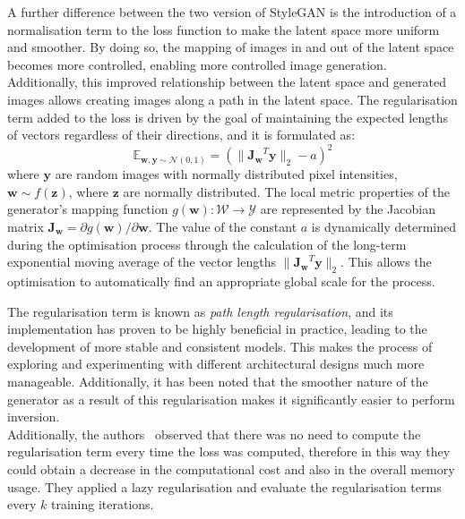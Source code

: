 \noindent A further difference between the two version of StyleGAN is the introduction of a normalisation term to the loss function to make the latent space more uniform and smoother. By doing so, the mapping of images in and out of the latent space becomes more controlled, enabling more controlled image generation. Additionally, this improved relationship between the latent space and generated images allows creating images along a path in the latent space. The regularisation term added to the loss is driven by the goal of maintaining the expected lengths of vectors regardless of their directions, and it is formulated as:
\begin{equation}
    \mathbb{E}_{\mathbf{w,y}\sim \mathcal{N}(0,1)}=(\| \mathbf{J_w}^T\mathbf{y}\|_2 - a)^2
\end{equation}
where $\mathbf{y}$ are random images with normally distributed pixel intensities, $\mathbf{w} \sim f(\mathbf{z})$, where $\mathbf{z}$ are normally distributed. The local metric properties of the generator's mapping function $g(\mathbf{w}): \mathcal{W}\rightarrow \mathcal{Y}$ are represented by the Jacobian matrix $\mathbf{J_w}=\partial g(\mathbf{w})/\partial \mathbf{w}$.
The value of the constant $a$ is dynamically determined during the optimisation process through the calculation of the long-term exponential moving average of the vector lengths $\| \mathbf{J_w}^T\mathbf{y} \|_2$. This allows the optimisation to automatically find an appropriate global scale for the process.

\noindent The regularisation term is known as \textit{path length regularisation}, and its implementation has proven to be highly beneficial in practice, leading to the development of more stable and consistent models. This makes the process of exploring and experimenting with different architectural designs much more manageable. Additionally, it has been noted that the smoother nature of the generator as a result of this regularisation makes it significantly easier to perform inversion.\\ 

\noindent Additionally, the authors~\cite{Karras2019stylegan2} observed that there was no need to compute the regularisation term every time the loss was computed, therefore in this way they could obtain a decrease in the computational cost and also in the overall memory usage. They applied a lazy regularisation and evaluate the regularisation terms every $k$ training iterations.

